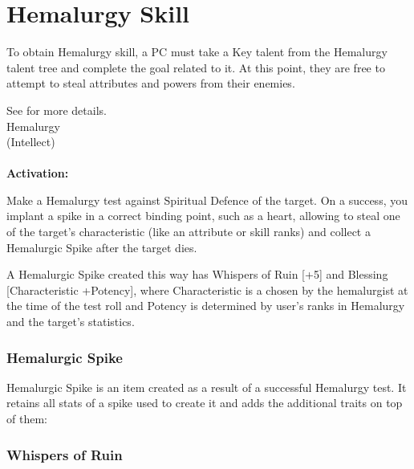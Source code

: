 \section{Hemalurgy Skill}
\label{sec:hemalurgySkill}

To obtain Hemalurgy skill, a PC must take a Key talent from the Hemalurgy talent tree and complete the goal related to it. At this point, they are free to attempt to steal attributes and powers from their enemies.

See  for more details.\\

\noindent \huge Hemalurgy \\ \Large(Intellect) \normalsize \\ \\
\textbf{Activation:} \iconActionTriple{}

\noindent Make a Hemalurgy test against Spiritual Defence of the target. On a success, you implant a spike in a correct binding point, such as a heart, allowing to steal one of the target's characteristic (like an attribute or skill ranks) and collect a Hemalurgic Spike after the target dies.

A Hemalurgic Spike created this way has Whispers of Ruin [+5] and Blessing [Characteristic +Potency], where Characteristic is a chosen by the hemalurgist at the time of the test roll and Potency is determined by user's ranks in Hemalurgy and the target's statistics.


\newpage
\subsubsection{Hemalurgic Spike}

Hemalurgic Spike is an item created as a result of a successful Hemalurgy test. It retains all stats of a spike used to create it and adds the additional traits on top of them:





\subsubsection{Whispers of Ruin}

